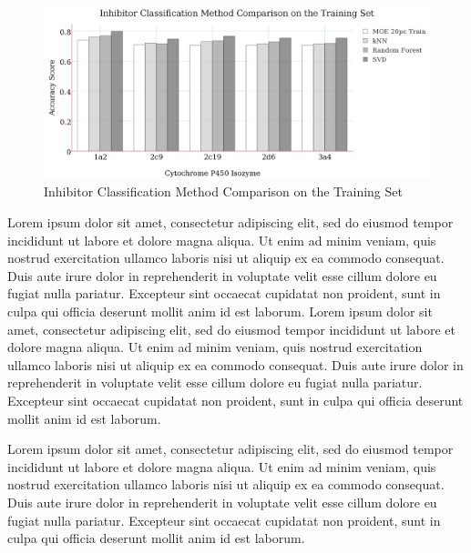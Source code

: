 \begin{figure}[!h]
\includegraphics[width=1\textwidth]{../img/method_comparison_training_set.png}
\caption{Inhibitor Classification Method Comparison on the Training Set}
\end{figure}

Lorem ipsum dolor sit amet, consectetur adipiscing elit, sed do eiusmod tempor incididunt ut labore et dolore magna aliqua. Ut enim ad minim veniam, quis nostrud exercitation ullamco laboris nisi ut aliquip ex ea commodo consequat. Duis aute irure dolor in reprehenderit in voluptate velit esse cillum dolore eu fugiat nulla pariatur. Excepteur sint occaecat cupidatat non proident, sunt in culpa qui officia deserunt mollit anim id est laborum. Lorem ipsum dolor sit amet, consectetur adipiscing elit, sed do eiusmod tempor incididunt ut labore et dolore magna aliqua. Ut enim ad minim veniam, quis nostrud exercitation ullamco laboris nisi ut aliquip ex ea commodo consequat. Duis aute irure dolor in reprehenderit in voluptate velit esse cillum dolore eu fugiat nulla pariatur. Excepteur sint occaecat cupidatat non proident, sunt in culpa qui officia deserunt mollit anim id est laborum.

Lorem ipsum dolor sit amet, consectetur adipiscing elit, sed do eiusmod tempor incididunt ut labore et dolore magna aliqua. Ut enim ad minim veniam, quis nostrud exercitation ullamco laboris nisi ut aliquip ex ea commodo consequat. Duis aute irure dolor in reprehenderit in voluptate velit esse cillum dolore eu fugiat nulla pariatur. Excepteur sint occaecat cupidatat non proident, sunt in culpa qui officia deserunt mollit anim id est laborum.



